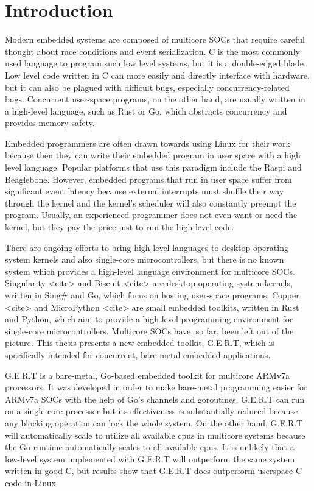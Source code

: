 \chapter{Introduction}

Modern embedded systems are composed of multicore SOCs that require
careful thought about race conditions and event serialization. C is the
most commonly used language to program such low level systems, but it is
a double-edged blade. Low level code written in C can more easily and
directly interface with hardware, but it can also be plagued with
difficult bugs, especially concurrency-related bugs. Concurrent
user-space programs, on the other hand, are usually written in a
high-level language, such as Rust or Go, which abstracts concurrency
and provides memory safety.

Embedded programmers are often drawn towards using Linux for their work
because then they can write their embedded program in user space with a
high level language. Popular platforms that use this paradigm include
the Raspi and Beaglebone. However, embedded programs that run in user space suffer
from significant event latency because external interrupts
must shuffle their way through the kernel and the kernel's scheduler
will also constantly preempt the program. Usually, an experienced programmer
does not even want or need the kernel, but they pay the price just to run the
high-level code.

There are ongoing efforts to bring high-level languages to desktop
operating system kernels and also single-core microcontrollers, but
there is no known system which provides a high-level language environment for
multicore SOCs. Singularity <cite> and Biscuit <cite> are desktop
operating system kernels, written in Sing\# and Go, which focus on
hosting user-space programs. Copper <cite> and MicroPython <cite>
are small embedded toolkits, written in Rust and Python, which aim
to provide a high-level programming environment for single-core
microcontrollers. Multicore SOCs have, so far, been left out of the
picture. This thesis presents a new embedded toolkit, G.E.R.T, which
is specifically intended for concurrent, bare-metal embedded applications.

G.E.R.T is a bare-metal, Go-based embedded toolkit for multicore ARMv7a processors.
It was developed in order to make bare-metal programming
easier for ARMv7a SOCs with the help of Go's channels and goroutines.
G.E.R.T can run on a single-core processor but its effectiveness is substantially
reduced because any blocking operation can lock the whole system. On the other hand,
G.E.R.T will automatically scale to utilize all available cpus in multicore systems
because the Go runtime automatically scales to all available cpus. It is unlikely
that a low-level system implemented with G.E.R.T will outperform the same system written in
good C, but results show that G.E.R.T does outperform userspace
C code in Linux.

